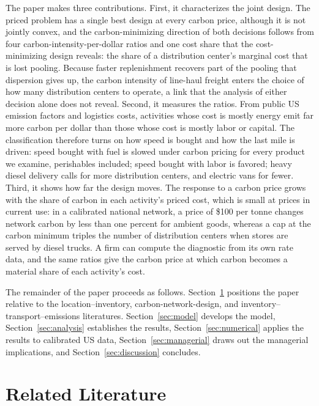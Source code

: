\documentclass[11pt]{article}
\theoremstyle{definition}
\theoremstyle{remark}
\theoremstyle{plain}
\begin{document}
The paper makes three contributions. First, it characterizes the joint design. The priced problem has a
single best design at every carbon price, although it is not jointly convex, and the carbon-minimizing
direction of both decisions follows from four carbon-intensity-per-dollar ratios and one cost share that the
cost-minimizing design reveals: the share of a distribution center's marginal cost that is lost pooling.
Because faster replenishment recovers part of the pooling that dispersion gives up, the carbon intensity of
line-haul freight enters the choice of how many distribution centers to operate, a link that the analysis of
either decision alone does not reveal. Second, it measures the ratios. From public US emission factors and
logistics costs, activities whose cost is mostly energy emit far more carbon per dollar than those whose cost
is mostly labor or capital. The classification therefore turns on how speed is bought and how the last mile is
driven: speed bought with fuel is slowed under carbon pricing for every product we examine, perishables
included; speed bought with labor is favored; heavy diesel delivery calls for more distribution centers, and
electric vans for fewer. Third, it shows how far the design moves. The response to a carbon price grows with
the share of carbon in each activity's priced cost, which is small at prices in current use: in a calibrated
national network, a price of \$100 per tonne changes network carbon by less than one percent for ambient
goods, whereas a cap at the carbon minimum triples the number of distribution centers when stores are served
by diesel trucks. A firm can compute the diagnostic from its own rate data, and the same ratios give the carbon
price at which carbon becomes a material share of each activity's cost.

The remainder of the paper proceeds as follows. Section~\ref{sec:related} positions the paper relative to
the location--inventory, carbon-network-design, and inventory--transport--emissions literatures.
Section~\ref{sec:model} develops the model, Section~\ref{sec:analysis} establishes the results,
Section~\ref{sec:numerical} applies the results to calibrated US data, Section~\ref{sec:managerial} draws out the
managerial implications, and Section~\ref{sec:discussion} concludes.
\section{Related Literature}\label{sec:related}
\end{document}
